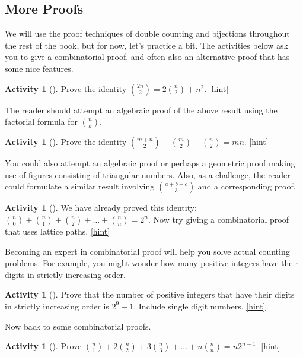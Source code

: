 \documentclass[10pt,]{book}
\theoremstyle{plain}
\theoremstyle{definition}
\theoremstyle{definition}
\theoremstyle{definition}
\newtheorem{activity}[project]{Activity}
\numberwithin{equation}{chapter}
\begin{document}
\subsection[{More Proofs}]{More Proofs}\label{subsec-moreproofs}
\hypertarget{p-675}{}%
We will use the proof techniques of double counting and bijections throughout the rest of the book, but for now, let's practice a bit.  The activities below ask you to give a combinatorial proof, and often also an alternative proof that has some nice features.%
\begin{activity}[]\label{act-redgreenballs}
\hypertarget{p-676}{}%
Prove the identity \(\binom{2n}{2} = 2 \binom{n}{2} + n^{2}\).%
\hfill{\tiny\hyperlink{a-94}{[hint]}\hypertarget{q-94}{}}\end{activity}
\hypertarget{p-680}{}%
The reader should attempt an algebraic proof of the above result using the factorial formula for \(\binom{n}{k}\).%
\begin{activity}[]\label{act-bowtiefez}
\hypertarget{p-681}{}%
Prove the identity \(\binom{m + n}{2} - \binom{m}{2} - \binom{n}{2} = mn\).%
\hfill{\tiny\hyperlink{a-95}{[hint]}\hypertarget{q-95}{}}\end{activity}
\hypertarget{p-684}{}%
You could also attempt an algebraic proof or perhaps a geometric proof making use of figures consisting of triangular numbers. Also, as a challenge, the reader could formulate a similar result involving \(\binom{a + b + c}{3}\) and a corresponding proof.%
\begin{activity}[]\label{activity-89}
\hypertarget{p-685}{}%
We have already proved this identity: \(\binom{n}{0} + \binom{n}{1} + \binom{n}{2} + \ldots + \binom{n}{n} = 2^{n}\).  Now try giving a combinatorial proof that uses lattice paths.%
\hfill{\tiny\hyperlink{a-96}{[hint]}\hypertarget{q-96}{}}\end{activity}
\hypertarget{p-688}{}%
Becoming an expert in combinatorial proof will help you solve actual counting problems.  For example, you might wonder how many positive integers have their digits in strictly increasing order.%
\begin{activity}[]\label{activity-90}
\hypertarget{p-689}{}%
Prove that the number of positive integers that have their digits in strictly increasing order is \(2^{9} - 1\). Include single digit numbers.%
\hfill{\tiny\hyperlink{a-97}{[hint]}\hypertarget{q-97}{}}\end{activity}
\hypertarget{p-693}{}%
Now back to some combinatorial proofs.%
\begin{activity}[]\label{act_anysizecommittee}
\hypertarget{p-694}{}%
Prove \(\binom{n}{1} + 2 \binom{n}{2} + 3 \binom{n}{3} + \ldots + n \binom{n}{n} = n2^{n - 1}\).%
\hfill{\tiny\hyperlink{a-98}{[hint]}\hypertarget{q-98}{}}\end{activity}
\end{document}
